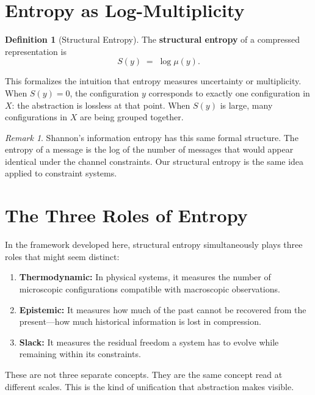 \documentclass[11pt]{book}
\theoremstyle{plain}
\theoremstyle{definition}
\newtheorem{definition}[theorem]{Definition}
\theoremstyle{remark}
\newtheorem{remark}[theorem]{Remark}
\newcommand{\Ss}{S}
\begin{document}
\section{Entropy as Log-Multiplicity}

\begin{definition}[Structural Entropy]
The \textbf{structural entropy} of a compressed representation is
\[
  \Ss(y) \;=\; \log \mu(y).
\]
\end{definition}

This formalizes the intuition that entropy measures uncertainty or
multiplicity. When $\Ss(y) = 0$, the configuration $y$ corresponds to
exactly one configuration in $X$: the abstraction is lossless at that
point. When $\Ss(y)$ is large, many configurations in $X$ are being
grouped together.

\begin{remark}
Shannon's information entropy \cite{shannon1948} has this same formal
structure. The entropy of a message is the log of the number of messages
that would appear identical under the channel constraints. Our structural
entropy is the same idea applied to constraint systems.
\end{remark}

\section{The Three Roles of Entropy}

In the framework developed here, structural entropy simultaneously plays
three roles that might seem distinct:

\begin{enumerate}
  \item \textbf{Thermodynamic:} In physical systems, it measures the number
        of microscopic configurations compatible with macroscopic observations.
  \item \textbf{Epistemic:} It measures how much of the past cannot be
        recovered from the present---how much historical information is lost
        in compression.
  \item \textbf{Slack:} It measures the residual freedom a system has to
        evolve while remaining within its constraints.
\end{enumerate}

These are not three separate concepts. They are the same concept read at
different scales. This is the kind of unification that abstraction makes
visible.
\end{document}
